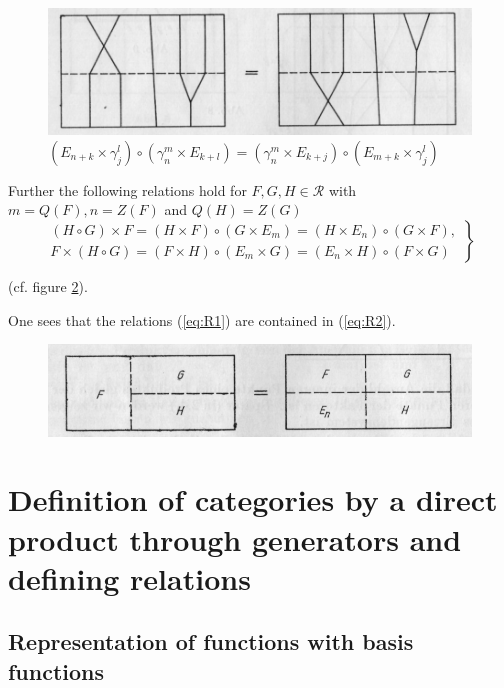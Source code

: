 \documentclass{article}
\begin{document}
\begin{figure}
\includegraphics[]{figure10.png}
\caption{$(E_{n+k} \times \gamma_j^l) \circ (\gamma_n^m \times E_{k + l}) = (\gamma_n^m \times E_{k+j}) \circ (E_{m+k} \times \gamma_j^l)$ }
\label{fig:figure10}
\end{figure}

Further the following relations hold for $F, G, H \in \mathcal{R}$ with $m = Q(F), n = Z(F)$ and $Q(H)=Z(G)$
\begin{equation}
\label{eq:R2}
\tag{R2}
\left.
\begin{array}{c}
(H \circ G) \times F = (H \times F) \circ (G \times E_m) = (H \times E_n) \circ (G \times F), \\
F \times (H \circ G) = (F \times H) \circ (E_m \times G) = (E_n \times H) \circ (F \times G)
\end{array} 
\right\}
\end{equation}

(cf. figure \ref{fig:figure11}).

One sees that the relations (\ref{eq:R1}) are contained in (\ref{eq:R2}).


\begin{figure}
\includegraphics[]{figure11.png}
\caption{}
\label{fig:figure11}
\end{figure}







\section{Definition of categories by a direct product through generators and defining relations}
\subsection{Representation of functions with basis functions}
\label{basis-function-representation}
\end{document}
